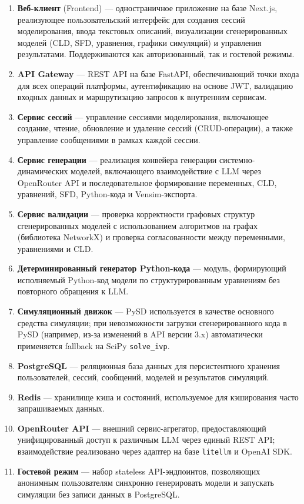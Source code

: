 \begin{enumerate}
    \item \textbf{Веб-клиент} (Frontend) --- одностраничное приложение на базе Next.js, реализующее пользовательский интерфейс для создания сессий моделирования, ввода текстовых описаний, визуализации сгенерированных моделей (CLD, SFD, уравнения, графики симуляций) и управления результатами. Поддерживаются как авторизованный, так и гостевой режимы.

    \item \textbf{API Gateway} --- REST API на базе FastAPI, обеспечивающий точки входа для всех операций платформы, аутентификацию на основе JWT, валидацию входных данных и маршрутизацию запросов к внутренним сервисам.

    \item \textbf{Сервис сессий} --- управление сессиями моделирования, включающее создание, чтение, обновление и удаление сессий (CRUD-операции), а также управление сообщениями в рамках каждой сессии.

    \item \textbf{Сервис генерации} --- реализация конвейера генерации системно-динамических моделей, включающего взаимодействие с LLM через OpenRouter API и последовательное формирование переменных, CLD, уравнений, SFD, Python-кода и Vensim-экспорта.

    \item \textbf{Сервис валидации} --- проверка корректности графовых структур сгенерированных моделей с использованием алгоритмов на графах (библиотека NetworkX) и проверка согласованности между переменными, уравнениями и CLD.

    \item \textbf{Детерминированный генератор Python-кода} --- модуль, формирующий исполняемый Python-код модели по структурированным уравнениям без повторного обращения к LLM.

    \item \textbf{Симуляционный движок} --- PySD используется в качестве основного средства симуляции; при невозможности загрузки сгенерированного кода в PySD (например, из-за изменений в API версии 3.x) автоматически применяется fallback на SciPy \texttt{solve\_ivp}.

    \item \textbf{PostgreSQL} --- реляционная база данных для персистентного хранения пользователей, сессий, сообщений, моделей и результатов симуляций.

    \item \textbf{Redis} --- хранилище кэша и состояний, используемое для кэширования часто запрашиваемых данных.

    \item \textbf{OpenRouter API} --- внешний сервис-агрегатор, предоставляющий унифицированный доступ к различным LLM через единый REST API; взаимодействие реализовано через адаптер на базе \texttt{litellm} и OpenAI SDK.

    \item \textbf{Гостевой режим} --- набор stateless API-эндпоинтов, позволяющих анонимным пользователям синхронно генерировать модели и запускать симуляции без записи данных в PostgreSQL.
\end{enumerate}

